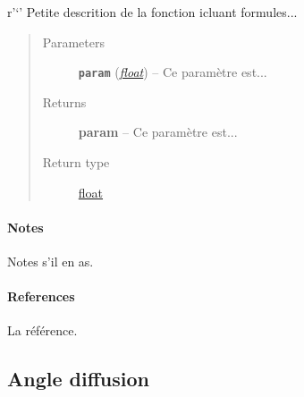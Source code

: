 \documentclass[letterpaper,10pt,english]{sphinxmanual}
\begin{document}
\begin{fulllineitems}
\label{python:solar_mod.alp_alpn}
r'`' Petite descrition de la fonction icluant formules...
\begin{quote}\begin{description}
\item[{Parameters}] \leavevmode
\textbf{\texttt{param}} (\href{https://docs.python.org/library/functions.html\#float}{\emph{float}}) -- Ce paramètre est...

\item[{Returns}] \leavevmode
\textbf{param} -- Ce paramètre est...

\item[{Return type}] \leavevmode
\href{https://docs.python.org/library/functions.html\#float}{float}

\end{description}\end{quote}
\paragraph{Notes}

Notes s'il en as.
\paragraph{References}

La référence.

\end{fulllineitems}



\subsection{Angle diffusion}
\label{python:angle-diffusion}
\end{document}
